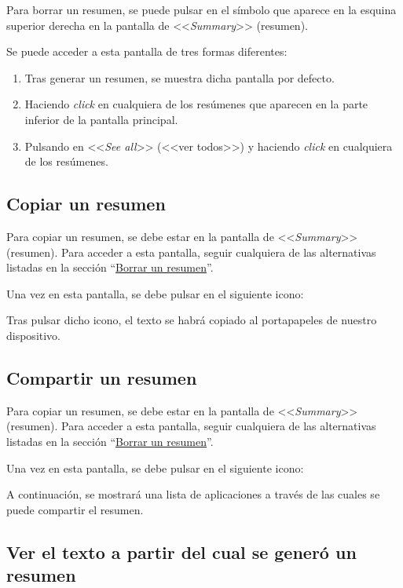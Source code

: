 Para borrar un resumen, se puede pulsar en el símbolo que aparece en la esquina superior derecha en la pantalla de <<\emph{Summary}>> (resumen).

Se puede acceder a esta pantalla de tres formas diferentes:

\begin{enumerate}
	\item Tras generar un resumen, se muestra dicha pantalla por defecto.
	
	\item Haciendo \emph{click} en cualquiera de los resúmenes que aparecen en la parte inferior de la pantalla principal.
	
	\item Pulsando en <<\emph{See all}>> (<<ver todos>>) y haciendo \emph{click} en cualquiera de los resúmenes.
\end{enumerate}


\subsection{Copiar un resumen}

Para copiar un resumen, se debe estar en la pantalla de <<\emph{Summary}>> (resumen). Para acceder a esta pantalla, seguir cualquiera de las alternativas listadas en la sección ``\hyperref[subsection:borrar]{Borrar un resumen}''.

Una vez en esta pantalla, se debe pulsar en el siguiente icono:

Tras pulsar dicho icono, el texto se habrá copiado al portapapeles de nuestro dispositivo.


\subsection{Compartir un resumen}

Para copiar un resumen, se debe estar en la pantalla de <<\emph{Summary}>> (resumen). Para acceder a esta pantalla, seguir cualquiera de las alternativas listadas en la sección ``\hyperref[subsection:borrar]{Borrar un resumen}''.

Una vez en esta pantalla, se debe pulsar en el siguiente icono:

A continuación, se mostrará una lista de aplicaciones a través de las cuales se puede compartir el resumen.


\subsection{Ver el texto a partir del cual se generó un resumen}

